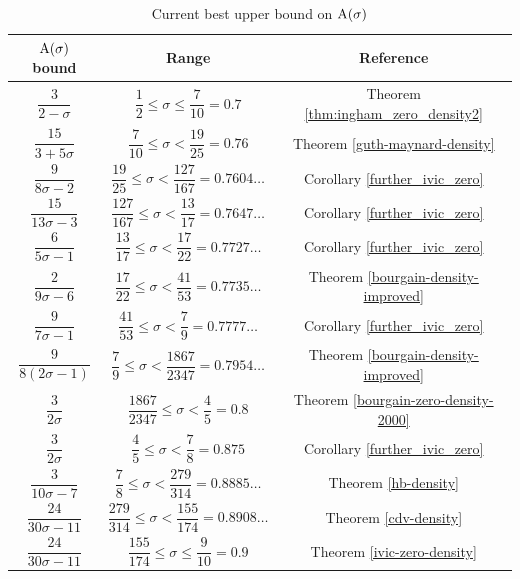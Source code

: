 \begin{table}[ht]
    \def\arraystretch{2}
    \centering
    \caption{Current best upper bound on $\mathrm{A}(\sigma)$}
    \begin{tabular}{|c|c|c|}
    \hline
    $\mathrm{A}(\sigma)$ bound & Range & Reference\\
    \hline
    $\dfrac{3}{2 - \sigma}$ & $\dfrac{1}{2} \leq \sigma \le \dfrac{7}{10} = 0.7$ & Theorem \ref{thm:ingham_zero_density2}\\
    \hline
    $\dfrac{15}{3+5\sigma}$ & $\dfrac{7}{10} \leq \sigma < \dfrac{19}{25} = 0.76$ & Theorem \ref{guth-maynard-density}\\
    \hline
    $\dfrac{9}{8\sigma - 2}$ & $\dfrac{19}{25} \leq \sigma < \dfrac{127}{167} = 0.7604\ldots$ & Corollary \ref{further_ivic_zero}\\
    \hline
    $\dfrac{15}{13\sigma - 3}$ & $\dfrac{127}{167} \leq \sigma < \dfrac{13}{17} = 0.7647\ldots$ & Corollary \ref{further_ivic_zero}\\
    \hline
    $\dfrac{6}{5\sigma - 1}$ & $\dfrac{13}{17} \leq \sigma < \dfrac{17}{22} = 0.7727\ldots$ & Corollary \ref{further_ivic_zero}\\
    \hline
    $\dfrac{2}{9\sigma - 6}$ & $\dfrac{17}{22} \leq \sigma < \dfrac{41}{53} = 0.7735\ldots$ & Theorem \ref{bourgain-density-improved}\\
    \hline
    $\dfrac{9}{7\sigma - 1}$ & $\dfrac{41}{53} \leq \sigma < \dfrac{7}{9} = 0.7777\ldots$ & Corollary \ref{further_ivic_zero}\\
    \hline
    $\dfrac{9}{8(2\sigma-1)}$ & $\dfrac{7}{9} \le \sigma < \dfrac{1867}{2347} = 0.7954\ldots$ & Theorem \ref{bourgain-density-improved} \\
    \hline
    $\dfrac{3}{2\sigma}$ & $\dfrac{1867}{2347} \le \sigma < \dfrac{4}{5} = 0.8$ & Theorem \ref{bourgain-zero-density-2000} \\
    \hline
    $\dfrac{3}{2\sigma}$ & $\dfrac{4}{5} \le \sigma < \dfrac{7}{8} = 0.875$ & Corollary \ref{further_ivic_zero} \\
    \hline
    $\dfrac{3}{10\sigma - 7}$ & $\dfrac{7}{8} \le \sigma < \dfrac{279}{314} = 0.8885\ldots$ & Theorem \ref{hb-density}\\
    \hline
    $\dfrac{24}{30\sigma - 11}$ & $\dfrac{279}{314} \le \sigma < \dfrac{155}{174} = 0.8908\ldots$ & Theorem \ref{cdv-density}  \\
    \hline
    $\dfrac{24}{30\sigma - 11}$& $\dfrac{155}{174} \le \sigma \le \dfrac{9}{10} = 0.9$ & Theorem \ref{ivic-zero-density}\\

\end{tabular}
\end{table}
